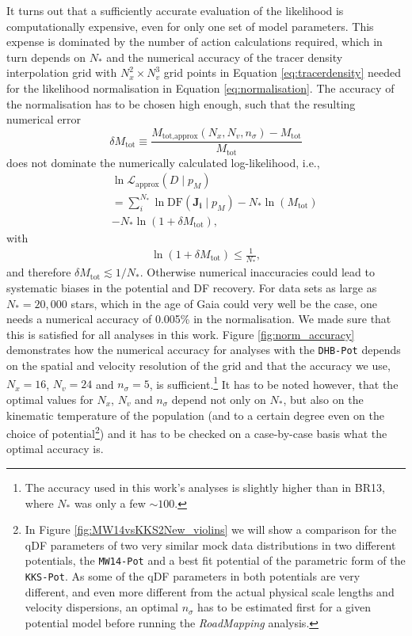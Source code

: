 \documentclass[iop,revtex4,numberedappendix,appendixfloats]{emulateapj}
\newcommand{\vect}[1]{\boldsymbol{#1}}
\newcommand{\pmodel}{\ensuremath{p_M}}
\newcommand{\RM}{{\sl RoadMapping}}
\begin{document}
It turns out that a sufficiently accurate evaluation of the likelihood is computationally expensive, even for only one set of model parameters. This expense is dominated by the number of action calculations required, which in turn depends on $N_*$ and the numerical accuracy of the tracer density interpolation grid with $N_x^2 \times N_v^3$ grid points in Equation \eqref{eq:tracerdensity} needed for the likelihood normalisation in Equation \eqref{eq:normalisation}. The accuracy of the normalisation has to be chosen high enough, such that the resulting numerical error 
\begin{equation}
\delta M_\text{tot} \equiv \frac{M_\text{tot,approx}(N_x,N_v,n_\sigma) - M_\text{tot} }{M_\text{tot}}\label{eq:relerrlikelihood}
\end{equation}
does not dominate the numerically calculated log-likelihood, i.e.,
\begin{eqnarray}
& & \ln \mathscr{L}_\text{approx}(D \mid \pmodel) \nonumber\\
&& = \sum_i^{N_*} \ln \text{DF}(\vect{J_i} \mid \pmodel) - N_* \ln(M_\text{tot})\nonumber\\
&& - N_* \ln (1 + \delta M_\text{tot}),\label{eq:loglikelihood_relerr}
\end{eqnarray}
with
\begin{eqnarray}
\ln (1 + \delta M_\text{tot}) \leq \frac{1}{N_{*}},\label{eq:accuracycondition}
\end{eqnarray}
and therefore $\delta M_\text{tot} \lesssim 1/N_*$. Otherwise numerical inaccuracies could lead to systematic biases in the potential and DF recovery. For data sets as large as $N_* = 20,000$ stars, which in the age of Gaia could very well be the case, one needs a numerical accuracy of 0.005\% in the normalisation. We made sure that this is satisfied for all analyses in this work. Figure \ref{fig:norm_accuracy} demonstrates how the numerical accuracy for analyses with the \texttt{DHB-Pot} depends on the spatial and velocity resolution of the grid and that the accuracy we use, $N_x=16$, $N_v=24$ and $n_\sigma=5$, is sufficient.\footnote{The accuracy used in this work's analyses is slightly higher than in BR13, where $N_*$ was only a few $\sim 100$.} It has to be noted however, that the optimal values for $N_x$, $N_v$ and $n_\sigma$ depend not only on $N_*$, but also on the kinematic temperature of the population (and to a certain degree even on the choice of potential\footnote{In Figure \ref{fig:MW14vsKKS2New_violins} we will show a comparison for the qDF parameters of two very similar mock data distributions in two different potentials, the \texttt{MW14-Pot} and a best fit potential of the parametric form of the \texttt{KKS-Pot}. As some of the qDF parameters in both potentials are very different, and even more different from the actual physical scale lengths and velocity dispersions, an optimal $n_\sigma$ has to be estimated first for a given potential model before running the \RM{} analysis.}) and it has to be checked on a case-by-case basis what the optimal accuracy is. 
\end{document}
